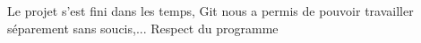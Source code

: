 Le projet s'est fini dans les temps,
Git nous a permis de pouvoir travailler séparement sans soucis,...
Respect du programme
